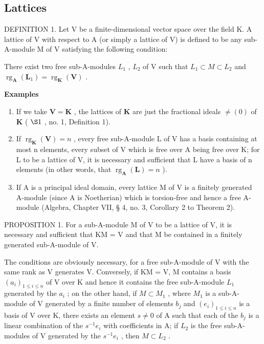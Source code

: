 \subsection{Lattices}

DEFINITION 1. Let V be a finite-dimensional vector space over the field K. A lattice of V with respect to A (or simply a lattice of V) is defined to be any sub-A-module M of V satisfying the following condition:

There exist two free sub-A-modules \(L_{1}\) , \(L_{2}\) of V such that \(L_{1} \subset M \subset L_{2}\) and \(\operatorname{rg}_{\mathbf{A}}(\mathbf{L}_{1}) = \operatorname{rg}_{\mathbf{K}}(\mathbf{V})\) .

\textbf{Examples}\par

\begin{enumerate}
\def\labelenumi{(\arabic{enumi})}
\item
  If we take \(\mathbf{V} = \mathbf{K}\) , the lattices of \(\mathbf{K}\) are just the fractional ideals \(\neq (0)\) of \(\mathbf{K}\) ( \(\S 1\) , no. 1, Definition 1).
\item
  If \(\operatorname{rg}_{\mathbf{K}}(\mathbf{V}) = n\) , every free sub-A-module L of V has a basis containing at most n elements, every subset of V which is free over A being free over K; for L to be a lattice of V, it is necessary and sufficient that L have a basis of n elements (in other words, that \(\operatorname{rg}_{\mathbf{A}}(\mathbf{L}) = n\) ).
\item
  If A is a principal ideal domain, every lattice M of V is a finitely generated A-module (since A is Noetherian) which is torsion-free and hence a free A-module (Algebra, Chapter VII, § 4, no. 3, Corollary 2 to Theorem 2).
\end{enumerate}

PROPOSITION 1. For a sub-A-module M of V to be a lattice of V, it is necessary and sufficient that KM = V and that M be contained in a finitely generated sub-A-module of V.

The conditions are obviously necessary, for a free sub-A-module of V with the same rank as V generates V. Conversely, if KM = V, M contains a basis \((a_{i})_{1 \leqslant i \leqslant n}\) of V over K and hence it contains the free sub-A-module \(L_{1}\) generated by the \(a_{i}\) ; on the other hand, if \(M \subset M_{1}\) , where \(M_{1}\) is a sub-A-module of V generated by a finite number of elements \(b_{j}\) and \((e_{i})_{1 \leqslant i \leqslant n}\) is a basis of V over K, there exists an element \(s \neq 0\) of A such that each of the \(b_{j}\) is a linear combination of the \(s^{-1}e_{i}\) with coefficients in A; if \(L_{2}\) is the free sub-A-modules of V generated by the \(s^{-1}e_{i}\) , then \(M \subset L_{2}\) .

